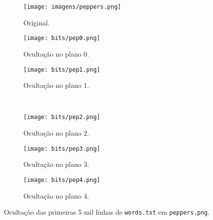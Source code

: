 \begin{figure}[H]
    \centering
    \begin{subfigure}{0.33\textwidth}
        \centering
        \texttt{[image: imagens/peppers.png]}
        \caption{Original.}
    \end{subfigure}%
    \begin{subfigure}{0.33\textwidth}
        \centering
        \texttt{[image: bits/pep0.png]}
        \caption{Ocultação no plano 0.}
    \end{subfigure}
    \begin{subfigure}{0.33\textwidth}
        \centering
        \texttt{[image: bits/pep1.png]}
        \caption{Ocultação no plano 1.}
    \end{subfigure}\\[8pt]
    \begin{subfigure}{0.33\textwidth}
        \centering
        \texttt{[image: bits/pep2.png]}
        \caption{Ocultação no plano 2.}
    \end{subfigure}%
    \begin{subfigure}{0.33\textwidth}
        \centering
        \texttt{[image: bits/pep3.png]}
        \caption{Ocultação no plano 3.}
        \label{fig:peppers:3}
    \end{subfigure}%
    \begin{subfigure}{0.33\textwidth}
        \centering
        \texttt{[image: bits/pep4.png]}
        \caption{Ocultação no plano 4.}
    \end{subfigure}

    \caption{Ocultação das primeiras 5 mil linhas de \texttt{words.txt} em \texttt{peppers.png}.}
    \label{fig:peppers}
\end{figure}
